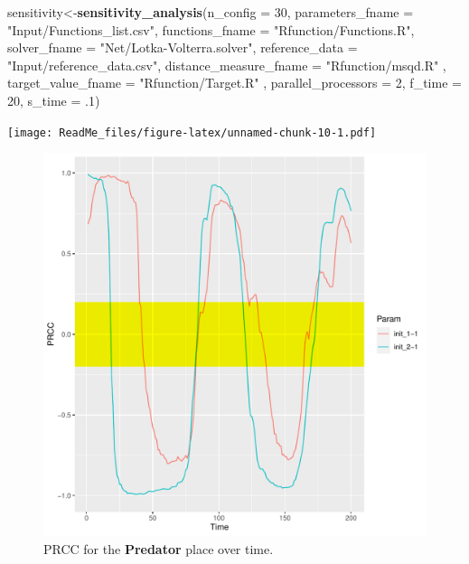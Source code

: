 \documentclass[
]{article}
\newenvironment{Shaded}{\begin{snugshade}}{\end{snugshade}}
\newcommand{\DataTypeTok}[1]{\textcolor[rgb]{0.13,0.29,0.53}{#1}}
\newcommand{\DecValTok}[1]{\textcolor[rgb]{0.00,0.00,0.81}{#1}}
\newcommand{\FloatTok}[1]{\textcolor[rgb]{0.00,0.00,0.81}{#1}}
\newcommand{\KeywordTok}[1]{\textcolor[rgb]{0.13,0.29,0.53}{\textbf{#1}}}
\newcommand{\NormalTok}[1]{#1}
\newcommand{\StringTok}[1]{\textcolor[rgb]{0.31,0.60,0.02}{#1}}
\begin{document}
\begin{Shaded}
\begin{Highlighting}[]

\NormalTok{sensitivity<-}\KeywordTok{sensitivity_analysis}\NormalTok{(}\DataTypeTok{n_config =} \DecValTok{30}\NormalTok{,}
                                  \DataTypeTok{parameters_fname =} \StringTok{"Input/Functions_list.csv"}\NormalTok{,}
                                  \DataTypeTok{functions_fname =} \StringTok{"Rfunction/Functions.R"}\NormalTok{,}
                                  \DataTypeTok{solver_fname =} \StringTok{"Net/Lotka-Volterra.solver"}\NormalTok{,}
                                  \DataTypeTok{reference_data =} \StringTok{"Input/reference_data.csv"}\NormalTok{,}
                                  \DataTypeTok{distance_measure_fname =} \StringTok{"Rfunction/msqd.R"}\NormalTok{ ,}
                                  \DataTypeTok{target_value_fname =} \StringTok{"Rfunction/Target.R"}\NormalTok{ ,}
                                  \DataTypeTok{parallel_processors =} \DecValTok{2}\NormalTok{,}
                                  \DataTypeTok{f_time =} \DecValTok{20}\NormalTok{,}
                                  \DataTypeTok{s_time =} \FloatTok{.1}\NormalTok{)}
\end{Highlighting}
\end{Shaded}

\texttt{[image: ReadMe\_files/figure-latex/unnamed-chunk-10-1.pdf]}

\begin{figure}
\centering
\includegraphics{./Results/results_sensitivity_analysis/prcc_Lotka-Volterra-sensitivity.pdf}
\caption{PRCC for the \textbf{Predator} place over time.}
\end{figure}
\end{document}
